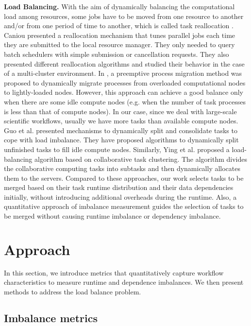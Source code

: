 \textbf{Load Balancing.} With the aim of dynamically balancing the computational load among resources, some jobs have to be moved from one resource to another and/or from one period of time to another, which is called task reallocation \cite{Tomas2012}. Caniou  \cite{Caniou2011} presented a reallocation mechanism that tunes parallel jobs each time they are submitted to the local resource manager. They only needed to query batch schedulers with simple submission or cancellation requests. They also presented different reallocation algorithms and studied their behavior in the case of a multi-cluster environment. In \cite{Zhang2000}, a preemptive process migration method was proposed to dynamically migrate processes from overloaded computational nodes to lightly-loaded nodes. However, this approach can achieve a good balance only when there are some idle compute nodes (e.g. when the number of task processes is less than that of compute nodes). In our case, since we deal with large-scale scientific workflows, usually we have more tasks than available compute nodes. 
Guo et al. \cite{Zhenhua2011} presented mechanisms to dynamically split and consolidate tasks to cope with load imbalance. They have proposed algorithms to dynamically split unfinished tasks to fill idle compute nodes. Similarly, Ying et al. \cite{Ying2009} proposed a load-balancing algorithm based on collaborative task clustering. The algorithm divides the collaborative computing tasks into subtasks and then dynamically allocates them to the servers. Compared to these approaches, our work selects tasks to be merged based on their task runtime distribution and their data dependencies initially, without introducing additional overheads during the runtime. Also, a quantitative approach of imbalance measurement guides the selection of tasks to be merged without causing runtime imbalance or dependency imbalance. 

\section{Approach}


 In this section, we introduce metrics that quantitatively capture workflow characteristics to measure runtime and dependence imbalances. We then present methods to address the load balance problem.



\subsection{Imbalance metrics}

